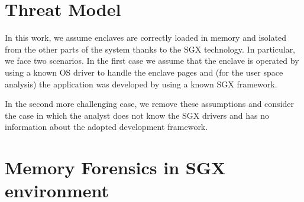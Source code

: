 \section{Threat Model}
\label{sec:system-assumptions}

In this work, we assume enclaves are correctly loaded in memory and
isolated from the other parts of the system thanks to the SGX technology.
In particular, we face two scenarios.
In the first case we assume that the enclave is operated by using a known
OS driver to handle the enclave pages and (for the user space analysis) the
application was developed by using a known SGX framework. 

In the second more challenging case, we remove these assumptions and consider
the case in which the analyst does not know the SGX drivers 
and has no information about the adopted development framework.

\section{Memory Forensics in SGX environment}
\label{sec:memory-forensic-sgx}



